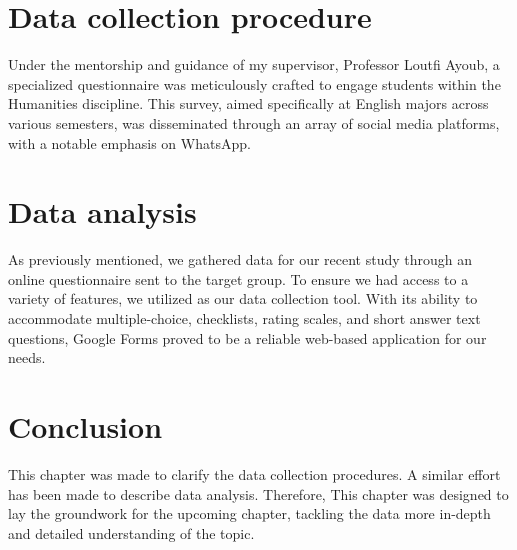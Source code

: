 \section{Data collection procedure}
Under the mentorship and guidance of my supervisor, Professor Loutfi Ayoub, 
a specialized questionnaire was meticulously crafted to engage students within 
the Humanities discipline. This survey, aimed specifically at English majors 
across various semesters, was disseminated through an array 
of social media platforms, with a notable emphasis on WhatsApp.
\section{Data analysis}

As previously mentioned, we gathered data for our recent study through an online questionnaire
sent to the target group. To ensure we had access to a variety of features, we utilized
 as our data collection tool. With its ability to accommodate multiple-choice,
checklists, rating scales, and short answer text questions, Google Forms proved to be a
reliable web-based application for our needs.
\section{Conclusion}
This chapter was made to clarify the data collection procedures. A similar effort has been made to
describe data analysis. Therefore, This chapter was designed to lay the groundwork for the upcoming
chapter, tackling the data more in-depth and detailed understanding of the topic.
